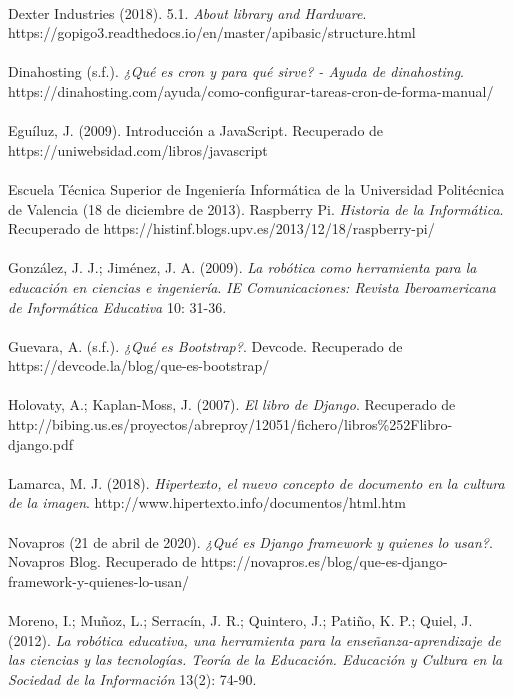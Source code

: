 \documentclass{report}
\begin{document}
\\
Dexter  Industries (2018). 5.1.  \textit{About library and Hardware}. https://gopigo3.readthedocs.io/en/master/api\-basic/structure.html
\\
\\
Dinahosting (s.f.). \textit{¿Qué es cron y para qué sirve? - Ayuda de dinahosting}. https://dinahosting.com/ayuda/como-configurar-tareas-cron-de-forma-manual/
\\
\\
Eguíluz, J. (2009). Introducción a JavaScript. Recuperado de https://uniwebsidad.com/libros/javascript
\\
\\
Escuela Técnica Superior de Ingeniería Informática de la Universidad Politécnica de Valencia (18 de diciembre de 2013). Raspberry Pi.  \textit{Historia de la Informática}. Recuperado de https://histinf.blogs.upv.es/2013/12/18/raspberry-pi/
\\
\\
González, J. J.; Jiménez, J. A. (2009). \textit{La robótica como herramienta para la educación en ciencias e ingeniería}. \textit{IE Comunicaciones: Revista Iberoamericana de Informática Educativa} 10: 31-36.
\\
\\
Guevara, A. (s.f.). \textit{¿Qué es Bootstrap?}. Devcode. Recuperado de https://devcode.la/blog/que-es-bootstrap/
\\
\\
Holovaty, A.; Kaplan-Moss, J. (2007).  \textit{El libro de Django}. Recuperado de http://bibing.us.es/proyectos/abreproy/12051/fichero/libros\%252Flibro-django.pdf
\\
\\
Lamarca, M. J. (2018). \textit{Hipertexto, el nuevo concepto de documento en la cultura de la imagen}. http://www.hipertexto.info/documentos/html.htm
\\
\\
Novapros (21 de abril de 2020). \textit{¿Qué es Django framework y quienes lo usan?}. Novapros Blog. Recuperado de https://novapros.es/blog/que-es-django-framework-y-quienes-lo-usan/
\\
\\
Moreno, I.; Muñoz, L.; Serracín, J. R.; Quintero, J.; Patiño, K. P.; Quiel, J. (2012).\textit{ La robótica educativa, una herramienta para la enseñanza-aprendizaje de las ciencias y las tecnologías. Teoría de la Educación. Educación y Cultura en la Sociedad de la Información} 13(2): 74-90.
\\
\end{document}
